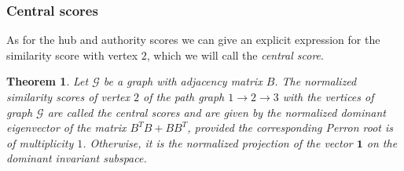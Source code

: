 \documentclass[a4paper,11pt]{report}
\newtheorem{theorem}{Theorem}[section]
\newcommand{\graf}{\mathscr{G}}
\begin{document}
\subsubsection{Central scores}\label{centralescooores}
As for the hub and authority scores we can give an explicit expression for the 
similarity score with vertex $2$, which we will call the \emph{central score}. 
\begin{theorem}\label{centralescore}
  Let $\graf$ be a graph with adjacency matrix $B$. The normalized similarity scores of vertex $2$ 
  of the path graph $1 \to 2 \to 3$ with the vertices of graph $\graf$ are called the central 
  scores and are given by the normalized dominant eigenvector of the matrix 
  $B^TB+BB^T$, provided the corresponding Perron root is of multiplicity $1$. 
  Otherwise, it is the normalized projection of the vector $\mathbf{1}$ on the 
  dominant invariant subspace.
  \end{theorem}
  
\end{document}
